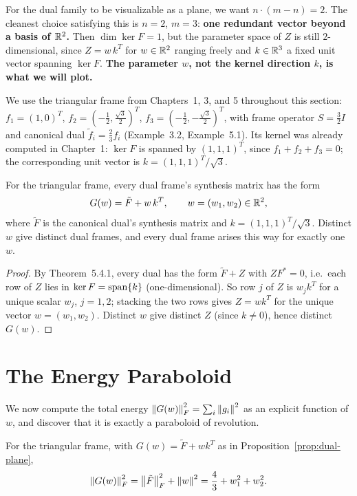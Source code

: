 \begin{keyidea}
For the dual family to be visualizable as a plane, we want
$n\cdot(m-n)=2$. The cleanest choice satisfying this is $n=2$, $m=3$:
\textbf{one redundant vector beyond a basis of $\mathbb{R}^2$.} Then
$\dim\ker F = 1$, but the parameter space of $Z$ is still
$2$-dimensional, since $Z=w\,k^T$ for $w\in\mathbb{R}^2$ ranging freely and
$k\in\mathbb{R}^3$ a fixed unit vector spanning $\ker F$. \textbf{The parameter
$w$, not the kernel direction $k$, is what we will plot.}
\end{keyidea}

We use the triangular frame from Chapters~1, 3, and 5 throughout this
section: $f_1=(1,0)^T$, $f_2=(-\tfrac12,\tfrac{\sqrt3}{2})^T$,
$f_3=(-\tfrac12,-\tfrac{\sqrt3}{2})^T$, with frame operator $S=\tfrac32I$
and canonical dual $\tilde f_i = \tfrac23f_i$ (Example~3.2,
Example~5.1). Its kernel was already computed in Chapter~1: $\ker F$ is
spanned by $(1,1,1)^T$, since $f_1+f_2+f_3=0$; the corresponding unit
vector is $k = (1,1,1)^T/\sqrt3$.

\begin{proposition}
\label{prop:dual-plane}
For the triangular frame, every dual frame's synthesis matrix has the
form
\[
  G(w) = \tilde F + w\,k^T, \qquad w=(w_1,w_2)\in\mathbb{R}^2,
\]
where $\tilde F$ is the canonical dual's synthesis matrix and
$k=(1,1,1)^T/\sqrt3$. Distinct $w$ give distinct dual frames, and every
dual frame arises this way for exactly one $w$.
\end{proposition}

\begin{proof}
By Theorem~5.4.1, every dual has the form $\tilde F+Z$ with $ZF^*=0$,
i.e.\ each row of $Z$ lies in $\ker F=\operatorname{span}\{k\}$ (one-dimensional). So
row $j$ of $Z$ is $w_jk^T$ for a unique scalar $w_j$, $j=1,2$; stacking
the two rows gives $Z=wk^T$ for the unique vector $w=(w_1,w_2)$. Distinct
$w$ give distinct $Z$ (since $k\ne0$), hence distinct $G(w)$.
\end{proof}

\section{The Energy Paraboloid}
\label{sec:energy-paraboloid}

We now compute the total energy $\left\| G(w) \right\|_F^2=\sum_i\left\| g_i \right\|^2$ as
an explicit function of $w$, and discover that it is exactly a
paraboloid of revolution.

\begin{theorem}
\label{thm:energy-paraboloid}
For the triangular frame, with $G(w)=\tilde F+wk^T$ as in
Proposition~\ref{prop:dual-plane},
\[
  \left\| G(w) \right\|_F^2 = \left\| \tilde F \right\|_F^2 + \left\| w \right\|^2
  = \frac43 + w_1^2+w_2^2.
\]
\end{theorem}

